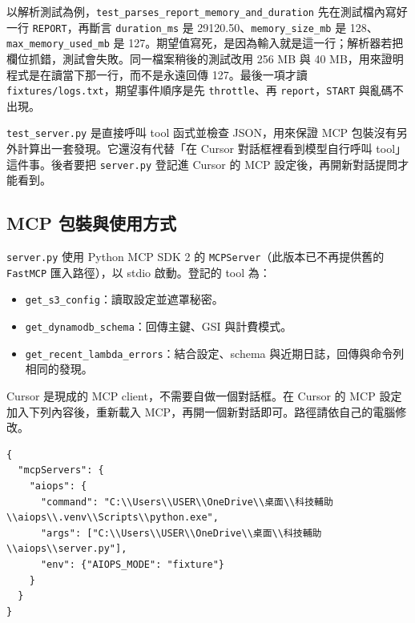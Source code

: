\documentclass[11pt]{article}
\begin{document}
以解析測試為例，\texttt{test\_parses\_report\_memory\_and\_duration} 先在測試檔內寫好一行 \texttt{REPORT}，再斷言 \texttt{duration\_ms} 是 29120.50、\texttt{memory\_size\_mb} 是 128、\texttt{max\_memory\_used\_mb} 是 127。期望值寫死，是因為輸入就是這一行；解析器若把欄位抓錯，測試會失敗。同一檔案稍後的測試改用 256 MB 與 40 MB，用來證明程式是在讀當下那一行，而不是永遠回傳 127。最後一項才讀 \texttt{fixtures/logs.txt}，期望事件順序是先 \texttt{throttle}、再 \texttt{report}，\texttt{START} 與亂碼不出現。

\texttt{test\_server.py} 是直接呼叫 tool 函式並檢查 JSON，用來保證 MCP 包裝沒有另外計算出一套發現。它還沒有代替「在 Cursor 對話框裡看到模型自行呼叫 tool」這件事。後者要把 \texttt{server.py} 登記進 Cursor 的 MCP 設定後，再開新對話提問才能看到。

\subsection{MCP 包裝與使用方式}

\texttt{server.py} 使用 Python MCP SDK 2 的 \texttt{MCPServer}（此版本已不再提供舊的 \texttt{FastMCP} 匯入路徑），以 stdio 啟動。登記的 tool 為：

\begin{itemize}
    \item \texttt{get\_s3\_config}：讀取設定並遮罩秘密。
    \item \texttt{get\_dynamodb\_schema}：回傳主鍵、GSI 與計費模式。
    \item \texttt{get\_recent\_lambda\_errors}：結合設定、schema 與近期日誌，回傳與命令列相同的發現。
\end{itemize}

Cursor 是現成的 MCP client，不需要自做一個對話框。在 Cursor 的 MCP 設定加入下列內容後，重新載入 MCP，再開一個新對話即可。路徑請依自己的電腦修改。

\begin{verbatim}
{
  "mcpServers": {
    "aiops": {
      "command": "C:\\Users\\USER\\OneDrive\\桌面\\科技輔助\\aiops\\.venv\\Scripts\\python.exe",
      "args": ["C:\\Users\\USER\\OneDrive\\桌面\\科技輔助\\aiops\\server.py"],
      "env": {"AIOPS_MODE": "fixture"}
    }
  }
}
\end{verbatim}
\end{document}
